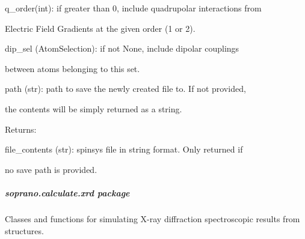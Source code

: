 \documentclass[letterpaper,10pt,english]{sphinxmanual}
\begin{document}
\begin{fulllineitems}
\begin{DUlineblock}{0em}
\begin{DUlineblock}{\DUlineblockindent}
\item[] q\_order(int): if greater than 0, include quadrupolar interactions from
\item[]
\begin{DUlineblock}{\DUlineblockindent}
\item[] Electric Field Gradients at the given order (1 or 2).
\end{DUlineblock}
\item[] dip\_sel (AtomSelection): if not None, include dipolar couplings
\item[]
\begin{DUlineblock}{\DUlineblockindent}
\item[] between atoms belonging to this set.
\end{DUlineblock}
\item[] path (str): path to save the newly created file to. If not provided,
\item[]
\begin{DUlineblock}{\DUlineblockindent}
\item[] the contents will be simply returned as a string.
\end{DUlineblock}
\end{DUlineblock}
\end{DUlineblock}

\begin{DUlineblock}{0em}
\item[] Returns:
\item[]
\begin{DUlineblock}{\DUlineblockindent}
\item[] file\_contents (str): spinsys file in string format. Only returned if
\item[]
\begin{DUlineblock}{\DUlineblockindent}
\item[] no save path is provided.
\end{DUlineblock}
\end{DUlineblock}
\end{DUlineblock}

\end{fulllineitems}



\subparagraph{soprano.calculate.xrd package}
\label{doctree/soprano.calculate.xrd:soprano-calculate-xrd-package}\label{doctree/soprano.calculate.xrd::doc}\label{doctree/soprano.calculate.xrd:module-soprano.calculate.xrd}
Classes and functions for simulating X-ray diffraction
spectroscopic results from structures.
\end{document}
